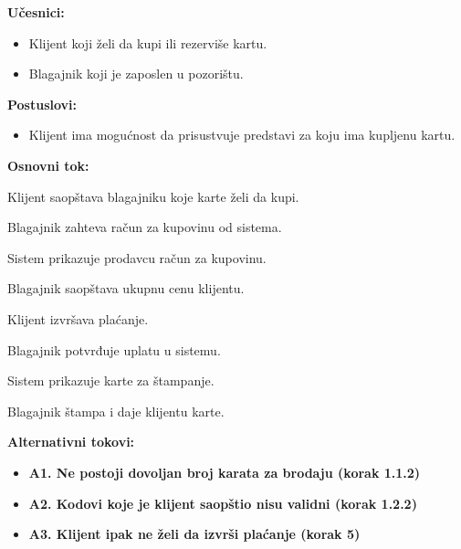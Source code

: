 \documentclass[a4paper]{article}
\begin{document}
\noindent\textbf{Učesnici:} 
  \begin{itemize}
    \item Klijent koji želi da kupi ili rezerviše kartu.
    \item Blagajnik koji je zaposlen u pozorištu.
  \end{itemize}

  \noindent\textbf{Postuslovi:} 
  \begin{itemize}
    \item Klijent ima mogućnost da prisustvuje predstavi za koju ima kupljenu kartu.
  \end{itemize}

  \noindent\textbf{Osnovni tok:}
  \begin{legal}
    \item Klijent saopštava blagajniku koje karte želi da kupi.
    \item Blagajnik zahteva račun za kupovinu od sistema.
    \item Sistem prikazuje prodavcu račun za kupovinu.
    \item Blagajnik saopštava ukupnu cenu klijentu.
    \item Klijent izvršava plaćanje.
    \item Blagajnik potvrđuje uplatu u sistemu.
    \item Sistem prikazuje karte za štampanje.
    \item Blagajnik štampa i daje klijentu karte.
  \end{legal}

  \noindent\textbf{Alternativni tokovi:} 
  \begin{itemize}
    \item \textbf{A1. Ne postoji dovoljan broj karata za brodaju (korak 1.1.2)} 
    \item \textbf{A2. Kodovi koje je klijent saopštio nisu validni (korak 1.2.2)} 
    \item \textbf{A3. Klijent ipak ne želi da izvrši plaćanje (korak 5)} 
  \end{itemize}
\end{document}
